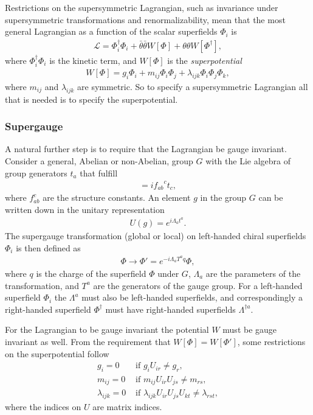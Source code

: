 \documentclass[twoside,english]{uiofysmaster}
\begin{document}
Restrictions on the supersymmetric Lagrangian, such as invariance under supersymmetric transformations and renormalizability, mean that the most general Lagrangian as a function of the scalar superfields $\Phi_i$ is
\begin{align}
\mathcal{L} = \Phi_i^{\dagger} \Phi_i + \bar{\theta} \bar{\theta} W[\Phi] + \theta \theta W[\Phi^{\dagger}],
\end{align}
where $\Phi_i^{\dagger} \Phi_i$ is the kinetic term, and $W[\Phi]$ is the \textit{superpotential}
\begin{align}\label{Eq:: superpotential}
W[\Phi] = g_i \Phi_i + m_{ij} \Phi_i \Phi_j + \lambda_{ijk} \Phi_i \Phi_j \Phi_k,
\end{align}
where $m_{ij}$ and $\lambda_{ijk}$ are symmetric. So to specify a supersymmetric Lagrangian all that is needed is to specify the superpotential. 

\subsubsection{Supergauge}\label{Sec:: phys back : Supergauge}



A natural further step is to require that the Lagrangian be gauge invariant. Consider a general, Abelian or non-Abelian, group $G$ with the Lie algebra of group generators $t_a$ that fulfill
\begin{align}
[t_a, t_b] = i {f_{ab}}^ct_c,
\end{align}
where ${f_{ab}^c}$ are the structure constants. An element $g$ in the group $G$ can be written down in the unitary representation
\begin{align}
U(g) = e^{i \Lambda_at^a}. 
\end{align}
The supergauge transformation (global or local) on left-handed chiral superfields $\Phi_i$ is then defined as \cite{batzing2017lecture} 
\begin{align}
\Phi \rightarrow \Phi' = e^{-i \Lambda_a T^a q} \Phi,
\end{align} 
where $q$ is the charge of the superfield $\Phi$ under $G$, $\Lambda_a$ are the parameters of the transformation, and $T^a$ are the generators of the gauge group. For a left-handed superfield $\Phi_i$ the $\Lambda^a$ must also be left-handed superfields, and correspondingly a right-handed superfield $\Phi^{\dagger}$ must have right-handed superfields $\Lambda^{\dagger a}$. 

For the Lagrangian to be gauge invariant the potential $W$ must be gauge invariant as well. From the requirement that $W[\Phi] = W[\Phi']$, some restrictions on the superpotential follow
\begin{align}
g_i = 0 &\text{ if } g_i U_{ir} \neq g_r,\\
m_{ij} = 0 &\text{ if } m_{ij} U_{ir} U_{js} \neq m_{rs},\\
\lambda_{ijk} = 0 &\text{ if } \lambda_{ijk}U_{ir}U_{js}U_{kt} \neq \lambda_{rst},
\end{align} 
where the indices on $U$ are matrix indices. 
\end{document}
